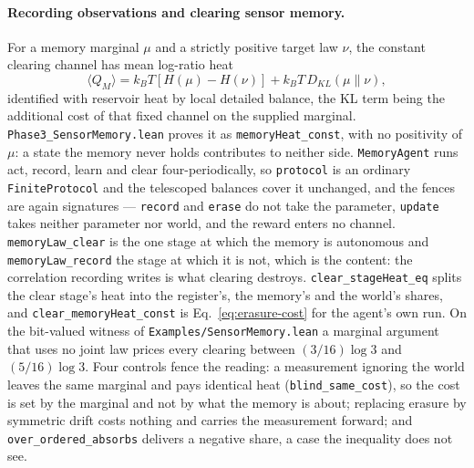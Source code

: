 \documentclass{article}
\begin{document}
\paragraph{Recording observations and clearing sensor memory.}
For a memory marginal $\mu$ and a strictly positive target law $\nu$, the constant clearing channel has mean log-ratio heat
\begin{equation}
 \langle Q_M\rangle=k_BT[H(\mu)-H(\nu)]+k_BT\,D_{KL}(\mu\|\nu),
 \label{eq:erasure-cost}
\end{equation}
identified with reservoir heat by local detailed balance, the KL term being the
additional cost of that fixed channel on the supplied marginal.
\nolinkurl{Phase3_SensorMemory.lean} proves it as
\nolinkurl{memoryHeat_const}, with no positivity of $\mu$: a state the
memory never holds contributes to neither side. \texttt{MemoryAgent} runs act,
record, learn and clear four-periodically, so \texttt{protocol} is an ordinary
\texttt{FiniteProtocol} and the telescoped balances cover it unchanged, and the
fences are again signatures --- \texttt{record} and \texttt{erase} do not take
the parameter, \texttt{update} takes neither parameter nor world, and the reward
enters no channel. \nolinkurl{memoryLaw_clear} is the one stage at
which the memory is autonomous and \nolinkurl{memoryLaw_record} the
stage at which it is not, which is the content: the correlation recording writes
is what clearing destroys. \nolinkurl{clear_stageHeat_eq}
splits the clear stage's heat into the register's, the memory's and the world's
shares, and \nolinkurl{clear_memoryHeat_const} is
Eq.~\eqref{eq:erasure-cost} for the agent's own run. On the bit-valued witness
of \nolinkurl{Examples/SensorMemory.lean} a marginal
argument that uses no joint law prices every clearing between $(3/16)\log3$ and
$(5/16)\log3$. Four controls fence the reading: a measurement ignoring the world
leaves the same marginal and pays identical heat
(\nolinkurl{blind_same_cost}), so the cost is set by the
marginal and not by what the memory is about; replacing erasure by symmetric
drift costs nothing and carries the measurement forward; and
\nolinkurl{over_ordered_absorbs} delivers a negative
share, a case the inequality does not see.
\end{document}
